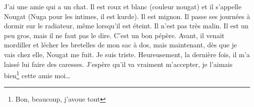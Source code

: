 J'ai une amie qui a un chat. Il est roux et blanc (couleur nougat) et il s'appelle Nougat (Nuga pour les intimes, il est
kurde). Il est mignon. Il passe ses
journées à dormir sur le radiateur, même lorsqu'il est éteint. Il n'est pas très malin. Il est un peu gros, mais il ne
faut pas le dire. C'est un bon pépère. Avant, il venait mordiller et lécher les bretelles de mon sac à dos, mais maintenant,
dès que je vais chez elle, Nougat me fuit. Je suis triste. Heureusement, la dernière fois, il m'a laissé lui faire des caresses. J'espère qu'il
va vraiment m'accepter, je l'aimais bien\footnote{Bon, beaucoup, j'avoue tout} cette amie moi\dots
\Pandada
